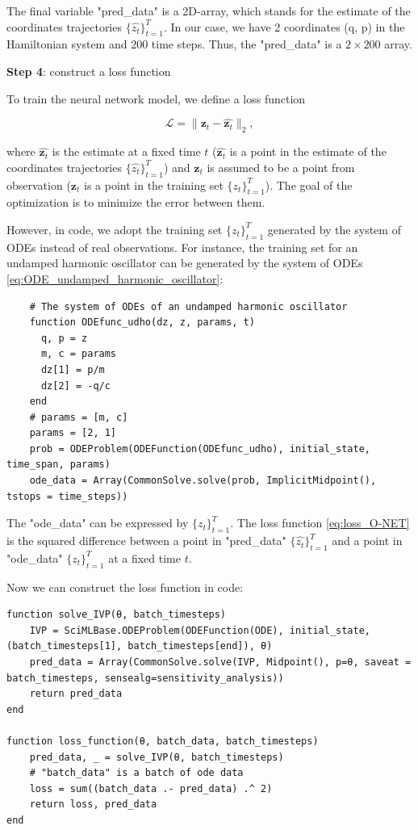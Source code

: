 \documentclass[
	parskip, 			   %
	twoside, 			   %
	DIV=14, 			   %
	BCOR=15.0mm, 		   %
	headsepline, 		   %
	open=right, 		   %
	captions=tableheading, %
	bibliography=totoc,    %
	numbers=noenddot       %
]{scrreprt}
\begin{document}
The final variable "pred\_data" is a 2D-array, which stands for the estimate of the coordinates trajectories $\{ \hat{z_{t}} \}_{t=1}^{T}$. In our case, we have 2 coordinates (q, p) in the Hamiltonian system and 200 time steps. Thus, the "pred\_data" is a $2 \times 200$ array.

\textbf{Step 4}: construct a loss function

To train the neural network model, we define a loss function

\begin{equation}
    \label{eq:loss_O-NET}
    \mathcal{L} = \lVert \mathbf{z}_{t} - \hat{\mathbf{z}_{t}} \rVert_{2},
\end{equation}

where $\hat{\mathbf{z}_{t}}$ is the estimate at a fixed time $t$ ($\hat{\mathbf{z}_{t}}$ is a point in the estimate of the coordinates trajectories $\{ \hat{z_{t}} \}_{t=1}^{T}$) and $\mathbf{z}_{t}$ is assumed to be a point from observation (${\mathbf{z}_{t}}$ is a point in the training set $\{ {z_{t}} \}_{t=1}^{T}$). The goal of the optimization is to minimize the error between them.

However, in code, we adopt the training set $\{ {z_{t}} \}_{t=1}^{T}$ generated by the system of ODEs instead of real observations. For instance, the training set for an undamped harmonic oscillator can be generated by the system of ODEs \ref{eq:ODE_undamped_harmonic_oscillator}:

\begin{verbatim}
    # The system of ODEs of an undamped harmonic oscillator
    function ODEfunc_udho(dz, z, params, t)
      q, p = z
      m, c = params
      dz[1] = p/m
      dz[2] = -q/c
    end
    # params = [m, c]
    params = [2, 1] 
    prob = ODEProblem(ODEFunction(ODEfunc_udho), initial_state, time_span, params)
    ode_data = Array(CommonSolve.solve(prob, ImplicitMidpoint(), tstops = time_steps))
\end{verbatim}

The "ode\_data" can be expressed by $\{ z_{t} \}_{t=1}^{T}$. The loss function \ref{eq:loss_O-NET} is the squared difference between a point in "pred\_data" $\{ \hat{z_{t}} \}_{t=1}^{T}$ and a point in "ode\_data" $\{ z_{t} \}_{t=1}^{T}$ at a fixed time $t$.

Now we can construct the loss function in code:
\begin{verbatim}
function solve_IVP(θ, batch_timesteps)
    IVP = SciMLBase.ODEProblem(ODEFunction(ODE), initial_state, (batch_timesteps[1], batch_timesteps[end]), θ)
    pred_data = Array(CommonSolve.solve(IVP, Midpoint(), p=θ, saveat = batch_timesteps, sensealg=sensitivity_analysis))
    return pred_data
end

function loss_function(θ, batch_data, batch_timesteps)
    pred_data, _ = solve_IVP(θ, batch_timesteps)
    # "batch_data" is a batch of ode data
    loss = sum((batch_data .- pred_data) .^ 2)
    return loss, pred_data
end
\end{verbatim}
\end{document}
